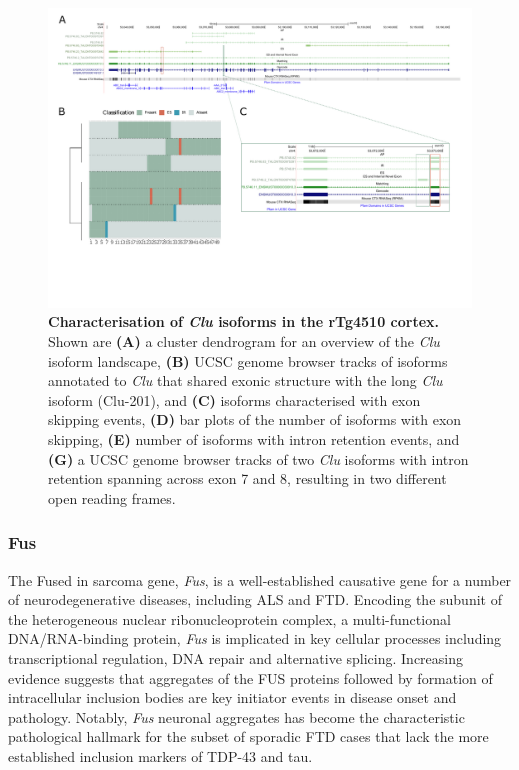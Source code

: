 \begin{landscape}
	\begin{figure}[htp]
		\centering
		\captionsetup{width=1.3\textwidth}
		\includegraphics[page=6,trim={0 1.5cm 0 0},scale = 0.85]{Figures/TargetGenes_Annotation_Landscape.pdf}
		\caption[Characterisation of the \textit{Clu} isoform landscape]%
		{\textbf{Characterisation of \textit{Clu} isoforms in the rTg4510 cortex.} Shown are \textbf{(A)} a cluster dendrogram for an overview of the \textit{Clu} isoform landscape, \textbf{(B)} UCSC genome browser tracks of isoforms annotated to \textit{Clu} that shared exonic structure with the long \textit{Clu} isoform (Clu-201), and \textbf{(C)} isoforms characterised with exon skipping events, \textbf{(D)} bar plots of the number of isoforms with exon skipping, \textbf{(E)} number of isoforms with intron retention events, and \textbf{(G)} a UCSC genome browser tracks of two \textit{Clu} isoforms with intron retention spanning across exon 7 and 8, resulting in two different open reading frames.}    
		\label{fig:clu}
	\end{figure}
\end{landscape}
\restoregeometry



\newpage
\subsubsection{Fus}
The Fused in sarcoma gene, \textit{Fus}, is a well-established causative gene for a number of neurodegenerative diseases, including ALS and FTD. Encoding the subunit of the heterogeneous nuclear ribonucleoprotein complex, a multi-functional DNA/RNA-binding protein,  \textit{Fus} is implicated in key cellular processes including transcriptional regulation, DNA repair and alternative splicing\cite{Shelkovnikova2014}. Increasing evidence suggests that aggregates of the FUS proteins followed by formation of intracellular inclusion bodies are key initiator events in disease onset and pathology\cite{Shelkovnikova2014}. Notably, \textit{Fus} neuronal aggregates has become the characteristic pathological hallmark for the subset of sporadic FTD cases that lack the more established inclusion markers of TDP-43 and tau\cite{Seelaar2010}.

